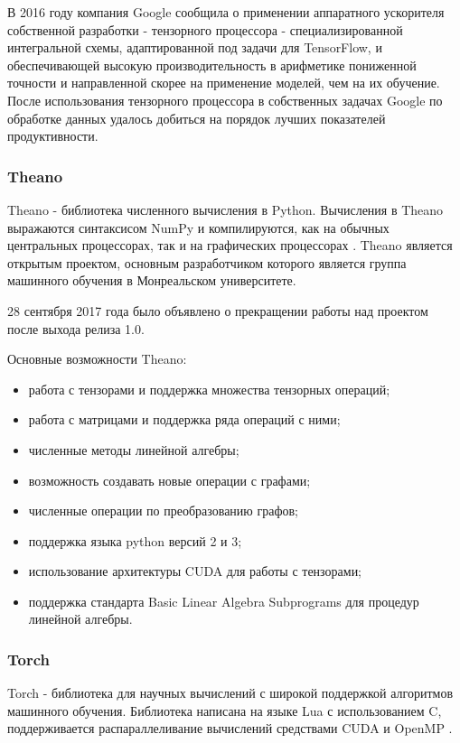 В 2016 году компания Google сообщила о применении аппаратного ускорителя собственной разработки - тензорного процессора - специализированной интегральной схемы, адаптированной под задачи для TensorFlow, и обеспечивающей высокую производительность в арифметике пониженной точности и направленной скорее на применение моделей, чем на их обучение. После использования тензорного процессора в собственных задачах Google по обработке данных удалось добиться на порядок лучших показателей продуктивности.

\subsubsection{Theano}

Theano - библиотека численного вычисления в Python. Вычисления в Theano выражаются синтаксисом NumPy и компилируются, как на обычных центральных процессорах, так и на графических процессорах \cite{Theano_doc} . Theano является открытым проектом, основным разработчиком которого является группа машинного обучения в Монреальском университете.

28 сентября 2017 года было объявлено о прекращении работы над проектом после выхода релиза 1.0.

Основные возможности Theano:
\begin{itemize}
\item работа с тензорами и поддержка множества тензорных операций;
\item работа с матрицами и поддержка ряда операций с ними;
\item численные методы линейной алгебры;
\item возможность создавать новые операции с графами;
\item численные операции по преобразованию графов;
\item поддержка языка python версий 2 и 3;
\item использование архитектуры CUDA для работы с тензорами;
\item поддержка стандарта Basic Linear Algebra Subprograms для процедур линейной алгебры.
\end{itemize}



\subsubsection{Torch}

Torch - библиотека для научных вычислений с широкой поддержкой алгоритмов машинного обучения. Библиотека написана на языке  Lua с использованием C, поддерживается распараллеливание вычислений средствами CUDA и OpenMP \cite{torch_doc} .

